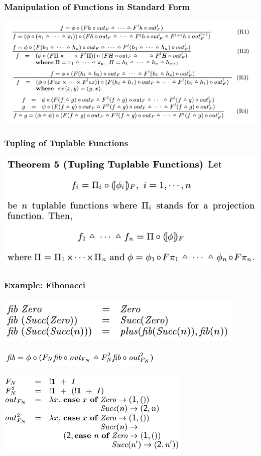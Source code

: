 \documentclass{beamer}
\begin{document}
\begin{frame}[fragile]
  \frametitle{Manipulation of Functions in Standard Form}
\includegraphics[width=\textwidth]{manipulation.png}
\end{frame}

\begin{frame}[fragile]
  \frametitle{Tupling of Tuplable Functions}
\includegraphics[width=\textwidth]{tupling.png}
\end{frame}

\begin{frame}[fragile]
  \frametitle{Example: Fibonacci}
\includegraphics[width=0.9\textwidth]{fibDef.png}

\vspace{0.3cm}

\includegraphics[width=0.6\textwidth]{fibDef1.png}

\vspace{0.3cm}

\includegraphics[width=0.7\textwidth]{Nat.png}
\end{frame}
\end{document}
